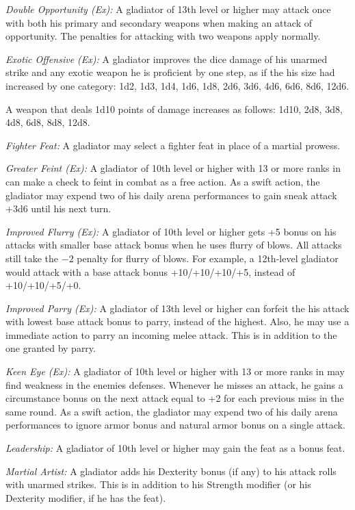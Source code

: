 \textit{Double Opportunity (Ex):} A gladiator of 13th level or higher may attack once with both his primary and secondary weapons when making an attack of opportunity. The penalties for attacking with two weapons apply normally.

\textit{Exotic Offensive (Ex):} A gladiator improves the dice damage of his unarmed strike and any exotic weapon he is proficient by one step, as if the his size had increased by one category: 1d2, 1d3, 1d4, 1d6, 1d8, 2d6, 3d6, 4d6, 6d6, 8d6, 12d6.

A weapon that deals 1d10 points of damage increases as follows: 1d10, 2d8, 3d8, 4d8, 6d8, 8d8, 12d8.

\textit{Fighter Feat:} A gladiator may select a fighter feat in place of a martial prowess.

\textit{Greater Feint (Ex):} A gladiator of 10th level or higher with 13 or more ranks in  can make a  check to feint in combat as a free action. As a swift action, the gladiator may expend two of his daily arena performances to gain sneak attack +3d6 until his next turn.

\textit{Improved Flurry (Ex):} A gladiator of 10th level or higher gets +5 bonus on his attacks with smaller base attack bonus when he uses flurry of blows. All attacks still take the $-2$ penalty for flurry of blows. For example, a 12th-level gladiator would attack with a base attack bonus +10/+10/+10/+5, instead of +10/+10/+5/+0.

\textit{Improved Parry (Ex):} A gladiator of 13th level or higher can forfeit the his attack with lowest base attack bonus to parry, instead of the highest. Also, he may use a immediate action to parry an incoming melee attack. This is in addition to the one granted by parry.

\textit{Keen Eye (Ex):} A gladiator of 10th level or higher with 13 or more ranks in  may find weakness in the enemies defenses. Whenever he misses an attack, he gains a circumstance bonus on the next attack equal to +2 for each previous miss in the same round. As a swift action, the gladiator may expend two of his daily arena performances to ignore armor bonus and natural armor bonus on a single attack. 

\textit{Leadership:} A gladiator of 10th level or higher may gain the  feat as a bonus feat.

\textit{Martial Artist:} A gladiator adds his Dexterity bonus (if any) to his attack rolls with unarmed strikes. This is in addition to his Strength modifier (or his Dexterity modifier, if he has the  feat).


